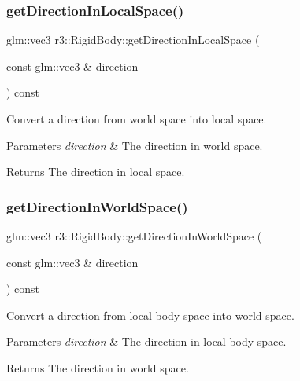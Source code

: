 \subsubsection{\texorpdfstring{get\+Direction\+In\+Local\+Space()}{getDirectionInLocalSpace()}}
{\footnotesize\ttfamily glm\+::vec3 r3\+::\+Rigid\+Body\+::get\+Direction\+In\+Local\+Space (\begin{DoxyParamCaption}\item[{const glm\+::vec3 \&}]{direction }\end{DoxyParamCaption}) const}



Convert a direction from world space into local space. 


\begin{DoxyParams}{Parameters}
{\em direction} & The direction in world space. \\
\hline
\end{DoxyParams}
\begin{DoxyReturn}{Returns}
The direction in local space. 
\end{DoxyReturn}
\mbox{\label{classr3_1_1_rigid_body_aa51f55f7c344d1d7754b91b565cb6eac}} 
\subsubsection{\texorpdfstring{get\+Direction\+In\+World\+Space()}{getDirectionInWorldSpace()}}
{\footnotesize\ttfamily glm\+::vec3 r3\+::\+Rigid\+Body\+::get\+Direction\+In\+World\+Space (\begin{DoxyParamCaption}\item[{const glm\+::vec3 \&}]{direction }\end{DoxyParamCaption}) const}



Convert a direction from local body space into world space. 


\begin{DoxyParams}{Parameters}
{\em direction} & The direction in local body space. \\
\hline
\end{DoxyParams}
\begin{DoxyReturn}{Returns}
The direction in world space. 
\end{DoxyReturn}
\mbox{\label{classr3_1_1_rigid_body_ae15bce9cc4aa2db577bdfb61464d26c0}} 
